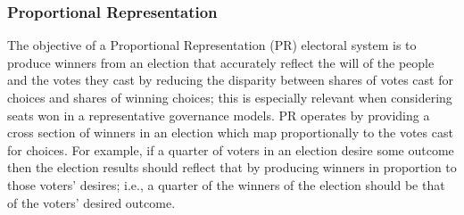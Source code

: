 %


\subsubsection{Proportional Representation}
The objective of a Proportional Representation (PR) electoral system is to
produce winners from an election that accurately reflect the will of the people
and the votes they cast by reducing the disparity between shares of votes cast
for choices and shares of winning choices; this is especially relevant when
considering seats won in a representative governance models. PR operates by
providing a cross section of winners in an election which map proportionally to
the votes cast for choices. For example, if a quarter of voters in an election
desire some outcome then the election results should reflect that by producing
winners in proportion to those voters' desires; i.e., a quarter of the winners
of the election should be that of the voters' desired outcome.


